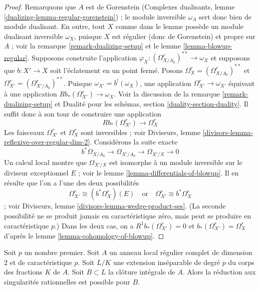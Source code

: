 \begin{proof} Remarquons que $A$ est de Gorenstein (Complexes dualisants, lemme \ref{dualizing-lemma-regular-gorenstein}) ; le module inversible $\omega_A$ sert donc bien de module dualisant. En outre, tout $X$ comme dans le lemme possède un module dualisant inversible $\omega_X$, puisque $X$ est régulier (donc de Gorenstein) et propre sur $A$ ; voir la remarque \ref{remark-dualizing-setup} et le lemme \ref{lemma-blowup-regular}. Supposons construite l'application $\varphi_X : (\Omega^r_{X/A_0})^{**} \to \omega_X$ et supposons que $b : X' \to X$ soit l'éclatement en un point fermé. Posons $\Omega^r_X = (\Omega^r_{X/A_0})^{**}$ et $\Omega^r_{X'} = (\Omega^r_{X'/A_0})^{**}$. Puisque $\omega_{X'} = b^!(\omega_X)$, une application $\Omega^r_{X'} \to \omega_{X'}$ équivaut à une application $Rb_*(\Omega^r_{X'}) \to \omega_X$. Voir la discussion de la remarque \ref{remark-dualizing-setup} et Dualité pour les schémas, section \ref{duality-section-duality}. Il suffit donc à son tour de construire une application $$
Rb_*(\Omega^r_{X'}) \longrightarrow \Omega^r_X
$$ Les faisceaux $\Omega^r_{X'}$ et $\Omega^r_X$ sont inversibles ; voir Diviseurs, lemme \ref{divisors-lemma-reflexive-over-regular-dim-2}. Considérons la suite exacte $$
b^*\Omega_{X/A_0} \to \Omega_{X'/A_0} \to \Omega_{X'/X} \to 0
$$ Un calcul local montre que $\Omega_{X'/X}$ est isomorphe à un module inversible sur le diviseur exceptionnel $E$ ; voir le lemme \ref{lemma-differentials-of-blowup}. Il en résulte que l'on a l'une des deux possibilités $$
\Omega^r_{X'} \cong (b^*\Omega^r_X)(E)
\quad\text{or}\quad
\Omega^r_{X'} \cong b^*\Omega^r_X
$$ ; voir Diviseurs, lemme \ref{divisors-lemma-wedge-product-ses}. (La seconde possibilité ne se produit jamais en caractéristique zéro, mais peut se produire en caractéristique $p$.) Dans les deux cas, on a $R^1b_*(\Omega^r_{X'}) = 0$ et $b_*(\Omega^r_{X'}) = \Omega^r_X$ d'après le lemme \ref{lemma-cohomology-of-blowup}. \end{proof}

\begin{lemma} \label{lemma-go-up-degree-p} Soit $p$ un nombre premier. Soit $A$ un anneau local régulier complet de dimension $2$ et de caractéristique $p$. Soit $L/K$ une extension inséparable de degré $p$ du corps des fractions $K$ de $A$. Soit $B \subset L$ la clôture intégrale de $A$. Alors la réduction aux singularités rationnelles est possible pour $B$. \end{lemma}

